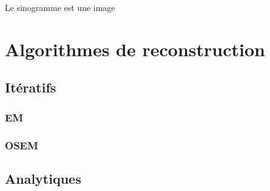 Le sinogramme est une image 
\chapter{Algorithmes de reconstruction}
	\section{Itératifs}
		\subsection{EM}
		\subsection{OSEM}
	\section{Analytiques}
